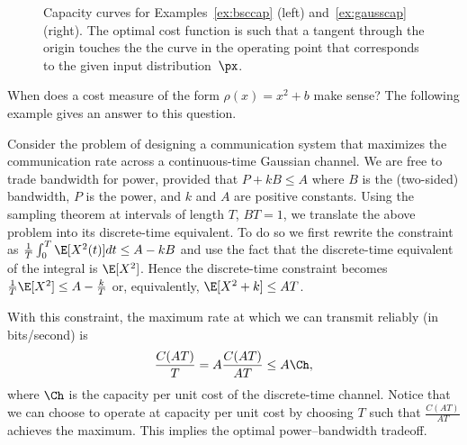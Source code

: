 \begin{figure}
  \centerline{%
  \subfloat[BSC]{\label{fig:bsccap}}%
  \hfil%
  \subfloat[Gaussian]{\label{fig:gausscap}}%
  }%
  \caption{Capacity curves for Examples~\ref{ex:bsccap} (left)
  and~\ref{ex:gausscap} (right). The optimal cost function is such that a
  tangent through the origin touches the the curve in the operating point
  that corresponds to the given input distribution~$\px$.}
\end{figure}

When does a cost measure of the form $\rho(x) = x^2 + b$ make sense? The
following example gives an answer to this question. 

\begin{example}
Consider the problem of designing a communication system that maximizes the
communication rate across a continuous-time Gaussian channel. We are free to
trade bandwidth for power, provided that  $P+k B \leq A$ where $B$ is the
(two-sided) bandwidth, $P$ is the power, and $k$ and $A$ are positive constants.
Using the sampling theorem at intervals of length $T$, $BT=1$, we translate the
above problem into its discrete-time equivalent. To do so we first rewrite the
constraint as $\frac{1}{T} \int_0^T \E[X^2(t)] dt \leq A- k B$ and use the fact
that the discrete-time equivalent of the integral is $\E [X^2]$. Hence the
discrete-time constraint becomes  $\frac{1}{T}\E [X^2] \leq A- \frac{k}{T}$ or,
equivalently, $\E [X^2 + k] \leq AT$. 


With this constraint, the maximum rate at which we can transmit reliably (in
bits/second) is
\[ \frac{C(AT)}{T} = A \frac{C(AT)}{AT} \le A \Ch, \]
where $\Ch$ is the capacity per unit cost of the discrete-time channel. Notice
that we can choose to operate at capacity per unit cost by choosing $T$ such
that   $\frac{C(AT)}{AT}$ achieves the maximum. This implies the optimal
power--bandwidth tradeoff.
\end{example}

